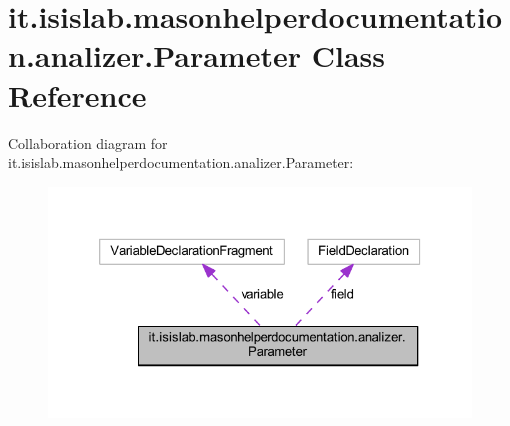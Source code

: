 \hypertarget{classit_1_1isislab_1_1masonhelperdocumentation_1_1analizer_1_1_parameter}{\section{it.\-isislab.\-masonhelperdocumentation.\-analizer.\-Parameter Class Reference}
\label{classit_1_1isislab_1_1masonhelperdocumentation_1_1analizer_1_1_parameter}
}


Collaboration diagram for it.\-isislab.\-masonhelperdocumentation.\-analizer.\-Parameter\-:\nopagebreak
\begin{figure}[H]
\begin{center}
\leavevmode
\includegraphics[width=326pt]{classit_1_1isislab_1_1masonhelperdocumentation_1_1analizer_1_1_parameter__coll__graph}
\end{center}
\end{figure}
